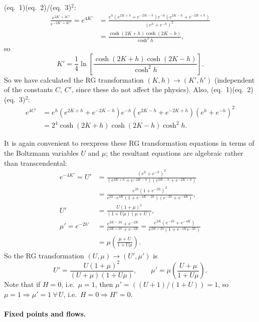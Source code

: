 (eq.~1)(eq.~2)/(eq.~3)$^2$:
\begin{align}
  \frac{e^{2K'+2C'}}{e^{-2K'+2C'}} = e^{4K'}
  &= \frac{e^h(e^{2K+h}+e^{-2K-h})e^{-h}(e^{2K-h}+e^{-2K+h})}{(e^h+e^{-h})^2}\nonumber\\
  &= \frac{\cosh(2K+h)\cosh(2K-h)}{\cosh^2h},
\end{align}
so
\begin{equation}
  K' = \frac{1}{4}\ln\left[\frac{\cosh(2K+h)\cosh(2K-h)}{\cosh^2h}\right].
\end{equation}
So we have calculated the RG transformation $(K,h)\to(K',h')$ (independent of the constants $C$, $C'$,
since these do not affect the physics). Also, (eq.~1)(eq.~2)(eq.~3)$^2$:
\begin{align}
  e^{4C'} &= e^h(e^{2K+h}+e^{-2K-h})e^{-h}(e^{2K-h}+e^{-2K+h})(e^h+e^{-h})^2\nonumber\\
          &= 2^4\cosh(2K+h)\cosh(2K-h)\cosh^2h .
\end{align}

It is again convenient to reexpress these RG transformation equations in terms of the Boltzmann variables
$U$ and $\mu$; the resultant equations are algebraic rather than transcendental:
\begin{align}
  e^{-4K'} = U' &= \frac{(e^h+e^{-h})^2}{(e^{2K+h}+e^{-2K-h})(e^{2K-h}+e^{-2K+h})}\nonumber\\
   &= \frac{e^{2h}(1+e^{-2h})^2}{e^{2h}\cdot e^{4K}(1+e^{-4K-2h})(e^{-2h}+e^{-4K})},\nonumber\\
  U' &= \frac{U(1+\mu)^2}{(1+U\mu)(\mu+U)},\\
  \mu' = e^{-2h'} &= \frac{e^{2K-2h}+e^{-2K}}{e^{2K+2h}+e^{-2K}}
   = \frac{e^{2K}(e^{-2h}+e^{-4K})}{e^{2K+2h}(1+e^{-4K}e^{-2h})}\nonumber\\
   &= \mu\left(\frac{\mu+U}{1+U\mu}\right).
\end{align}
So the RG transformation $(U,\mu)\to(U',\mu')$ is
\begin{equation}
  \boxed{U' = \frac{U(1+\mu)^2}{(U+\mu)(1+U\mu)}},\qquad
  \boxed{\mu' = \mu\left(\frac{U+\mu}{1+U\mu}\right)}.
\end{equation}
Note that if $H = 0$, i.e.\ $\mu = 1$, then $\mu' = \left((U+1)/(1+U)\right) = 1$, so
$\mu = 1\Rightarrow\mu' = 1\ \forall\,U$, i.e.\ $H = 0\Rightarrow H' = 0$.

\paragraph{Fixed points and flows.}

